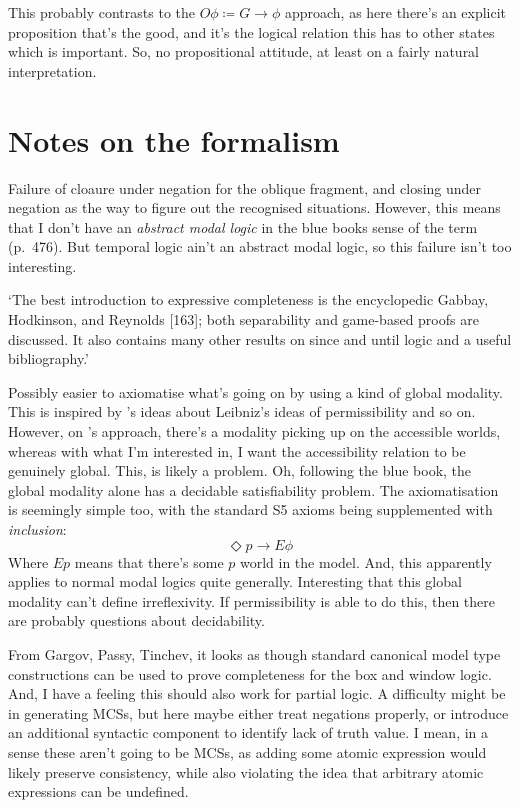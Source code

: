 \documentclass[10pt]{article}
\begin{document}
This probably contrasts to the \(O\phi \coloneq G \rightarrow \phi\) approach, as here there's an explicit proposition that's the good, and it's the logical relation this has to other states which is important.
So, no propositional attitude, at least on a fairly natural interpretation.


\section{Notes on the formalism}
\label{sec:notes-formalism}

Failure of cloaure under negation for the oblique fragment, and closing under negation as the way to figure out the recognised situations.
However, this means that I don't have an \emph{abstract modal logic} in the blue books sense of the term (p.\  476).
But temporal logic ain't an abstract modal logic, so this failure isn't too interesting.

`The best introduction to expressive completeness is the encyclopedic Gabbay, Hodkinson, and Reynolds [163]; both separability and game-based proofs are discussed. It also contains many other results on since and until logic and a useful bibliography.'

Possibly easier to axiomatise what's going on by using a kind of global modality.
This is inspired by \citeauthor{van-Benthem:1979aa}'s ideas about Leibniz's ideas of permissibility and so on.
However, on \citeauthor{van-Benthem:1979aa}'s approach, there's a modality picking up on the accessible worlds, whereas with what I'm interested in, I want the accessibility relation to be genuinely global.
This, is likely a problem.
Oh, following the blue book, the global modality alone has a decidable satisfiability problem.
The axiomatisation is seemingly simple too, with the standard S5 axioms being supplemented with \emph{inclusion}:
\[\Diamond p \rightarrow E\phi\]
Where \(Ep\) means that there's some \(p\) world in the model.
And, this apparently applies to normal modal logics quite generally.
Interesting that this global modality can't define irreflexivity.
If permissibility is able to do this, then there are probably questions about decidability.

From Gargov, Passy, Tinchev, it looks as though standard canonical model type constructions can be used to prove completeness for the box and window logic.
And, I have a feeling this should also work for partial logic.
A difficulty might be in generating MCSs, but here maybe either treat negations properly, or introduce an additional syntactic component to identify lack of truth value.
I mean, in a sense these aren't going to be MCSs, as adding some atomic expression would likely preserve consistency, while also violating the idea that arbitrary atomic expressions can be undefined.
\end{document}
